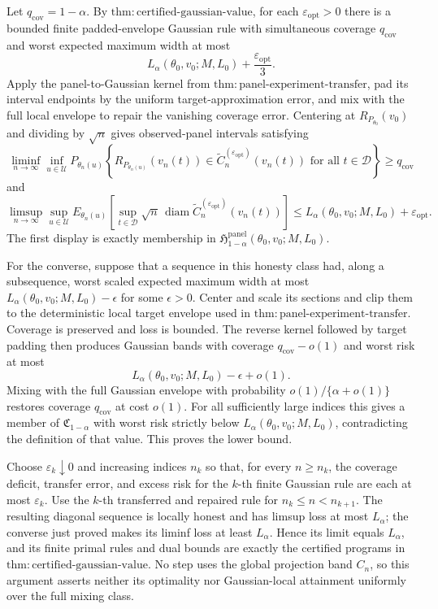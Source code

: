 Let \(q_{\mathrm{cov}}=1-\alpha\).  By
\(\mathrm{thm:certified\mbox{-}gaussian\mbox{-}value}\), for each
\(\varepsilon_{\mathrm{opt}}>0\) there is a bounded finite padded-envelope Gaussian rule with simultaneous coverage \(q_{\mathrm{cov}}\) and worst expected maximum width at most
\[
L_\alpha(\theta_0,v_0;M,L_0)+\frac{\varepsilon_{\mathrm{opt}}}{3}.
\]
Apply the panel-to-Gaussian kernel from
\(\mathrm{thm:panel\mbox{-}experiment\mbox{-}transfer}\), pad its interval endpoints by the uniform target-approximation error, and mix with the full local envelope to repair the vanishing coverage error.  Centering at
\(R_{P_{\theta_0}}(v_0)\) and dividing by \(\sqrt n\) gives observed-panel intervals satisfying
\[
\liminf_{n\to\infty}\inf_{u\in\mathcal U}
P_{\theta_n(u)}
\left\{
R_{P_{\theta_n(u)}}(v_n(t))
\in\widetilde C_n^{(\varepsilon_{\mathrm{opt}})}(v_n(t))
\text{ for all }t\in\mathcal D
\right\}
\ge q_{\mathrm{cov}}
\]
and
\[
\limsup_{n\to\infty}\sup_{u\in\mathcal U}
E_{\theta_n(u)}
\left[
\sup_{t\in\mathcal D}
\sqrt n\,
\operatorname{diam}
\widetilde C_n^{(\varepsilon_{\mathrm{opt}})}(v_n(t))
\right]
\le
L_\alpha(\theta_0,v_0;M,L_0)+\varepsilon_{\mathrm{opt}}.
\]
The first display is exactly membership in
\(\mathfrak H^{\mathrm{panel}}_{1-\alpha}(\theta_0,v_0;M,L_0)\).

For the converse, suppose that a sequence in this honesty class had, along a subsequence, worst scaled expected maximum width at most
\(L_\alpha(\theta_0,v_0;M,L_0)-\epsilon\) for some \(\epsilon>0\).  Center and scale its sections and clip them to the deterministic local target envelope used in
\(\mathrm{thm:panel\mbox{-}experiment\mbox{-}transfer}\).  Coverage is preserved and loss is bounded.  The reverse kernel followed by target padding then produces Gaussian bands with coverage
\(q_{\mathrm{cov}}-o(1)\) and worst risk at most
\[
L_\alpha(\theta_0,v_0;M,L_0)-\epsilon+o(1).
\]
Mixing with the full Gaussian envelope with probability
\(o(1)/\{\alpha+o(1)\}\) restores coverage \(q_{\mathrm{cov}}\) at cost \(o(1)\).  For all sufficiently large indices this gives a member of
\(\mathfrak C_{1-\alpha}\) with worst risk strictly below
\(L_\alpha(\theta_0,v_0;M,L_0)\), contradicting the definition of that value.  This proves the lower bound.

Choose \(\varepsilon_k\downarrow0\) and increasing indices \(n_k\) so that, for every \(n\ge n_k\), the coverage deficit, transfer error, and excess risk for the \(k\)-th finite Gaussian rule are each at most \(\varepsilon_k\).  Use the \(k\)-th transferred and repaired rule for
\(n_k\le n<n_{k+1}\).  The resulting diagonal sequence is locally honest and has limsup loss at most \(L_\alpha\); the converse just proved makes its liminf loss at least \(L_\alpha\).  Hence its limit equals \(L_\alpha\), and its finite primal rules and dual bounds are exactly the certified programs in
\(\mathrm{thm:certified\mbox{-}gaussian\mbox{-}value}\).  No step uses the global projection band \(C_n\), so this argument asserts neither its optimality nor Gaussian-local attainment uniformly over the full mixing class.

